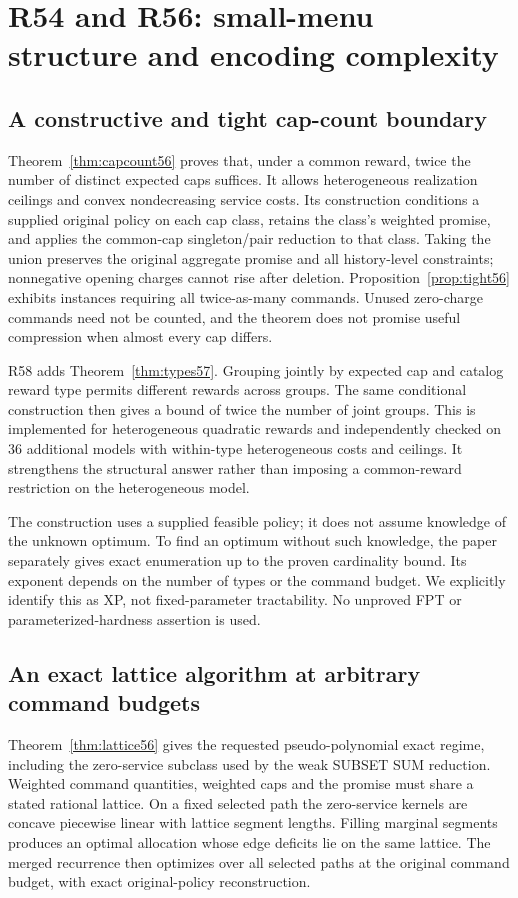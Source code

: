 \section{R54 and R56: small-menu structure and encoding complexity}
\subsection{A constructive and tight cap-count boundary}
Theorem~\ref{thm:capcount56} proves that, under a common reward, twice the number of distinct expected caps suffices. It allows heterogeneous realization ceilings and convex nondecreasing service costs. Its construction conditions a supplied original policy on each cap class, retains the class's weighted promise, and applies the common-cap singleton/pair reduction to that class. Taking the union preserves the original aggregate promise and all history-level constraints; nonnegative opening charges cannot rise after deletion. Proposition~\ref{prop:tight56} exhibits instances requiring all twice-as-many commands. Unused zero-charge commands need not be counted, and the theorem does not promise useful compression when almost every cap differs.

R58 adds Theorem~\ref{thm:types57}. Grouping jointly by expected cap and catalog reward type permits different rewards across groups. The same conditional construction then gives a bound of twice the number of joint groups. This is implemented for heterogeneous quadratic rewards and independently checked on 36 additional models with within-type heterogeneous costs and ceilings. It strengthens the structural answer rather than imposing a common-reward restriction on the heterogeneous model.

The construction uses a supplied feasible policy; it does not assume knowledge of the unknown optimum. To find an optimum without such knowledge, the paper separately gives exact enumeration up to the proven cardinality bound. Its exponent depends on the number of types or the command budget. We explicitly identify this as XP, not fixed-parameter tractability. No unproved FPT or parameterized-hardness assertion is used.

\subsection{An exact lattice algorithm at arbitrary command budgets}
Theorem~\ref{thm:lattice56} gives the requested pseudo-polynomial exact regime, including the zero-service subclass used by the weak SUBSET SUM reduction. Weighted command quantities, weighted caps and the promise must share a stated rational lattice. On a fixed selected path the zero-service kernels are concave piecewise linear with lattice segment lengths. Filling marginal segments produces an optimal allocation whose edge deficits lie on the same lattice. The merged recurrence then optimizes over all selected paths at the original command budget, with exact original-policy reconstruction.

